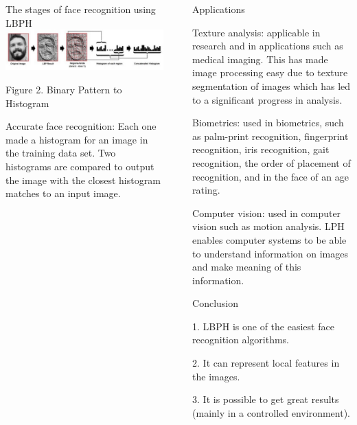 \documentclass[final]{beamer}
\newlength{\sepwidth}
\newlength{\colwidth}
\newcommand{\separatorcolumn}{\begin{column}{\sepwidth}\end{column}}
\begin{document}
\begin{frame}[t]
\begin{columns}[t]
\begin{column}{\colwidth}
\begin{block}{The stages of face recognition using LBPH}
\includegraphics{figure21}
\begin{center}
    \caption{Figure 2. Binary Pattern to Histogram}  
\end{center}


Accurate face recognition: Each one made a histogram for an image in the training data set. Two histograms are compared to output the image with the closest histogram matches to an input image.


  \end{block}

  
    
   

 

\end{column}

\separatorcolumn

\begin{column}{\colwidth}

  \begin{block}{Applications}

Texture analysis: applicable in research and in applications such as medical imaging. This has made image processing easy due to texture segmentation of images which has led to a significant progress in analysis.

Biometrics: used in biometrics, such as palm-print recognition, fingerprint recognition, iris recognition, gait recognition, the order of placement of recognition, and in the face of an age rating.

Computer vision: used in computer vision such as motion analysis. LPH enables computer systems to be able to understand information on images and make meaning of this information.


  \end{block}

  \begin{block}{Conclusion}

1. LBPH is one of the easiest face recognition algorithms.

2. It can represent local features in the images.

3. It is possible to get great results (mainly in a controlled environment).


\end{block}
\end{column}
\end{columns}
\end{frame}
\end{document}

